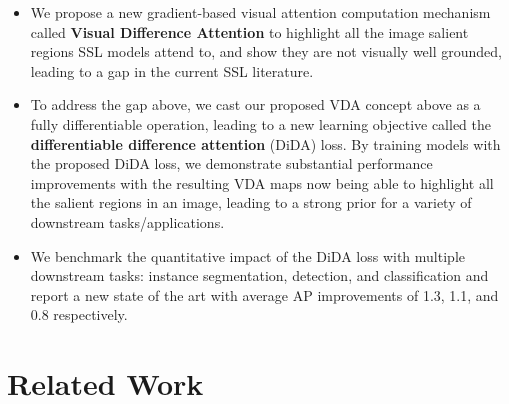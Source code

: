 \documentclass[10pt,twocolumn,letterpaper]{article}
\begin{document}
\begin{itemize}
\item We propose a new gradient-based visual attention computation mechanism called \textbf{Visual Difference Attention} to highlight all the image salient regions SSL models attend to, and show they are not visually well grounded, leading to a gap in the current SSL literature.

\item To address the gap above, we cast our proposed VDA concept above as a fully differentiable operation, leading to a new learning objective called the \textbf{differentiable difference attention} (DiDA) loss. By training models with the proposed DiDA loss, we demonstrate substantial performance improvements with the resulting VDA maps now being able to highlight all the salient regions in an image, leading to a strong prior for a variety of downstream tasks/applications.

\item We benchmark the quantitative impact of the DiDA loss with multiple downstream tasks: instance segmentation, detection, and classification and report a new state of the art with average AP improvements of 1.3, 1.1, and 0.8 respectively.
\end{itemize}




\section{Related Work} 
\end{document}
